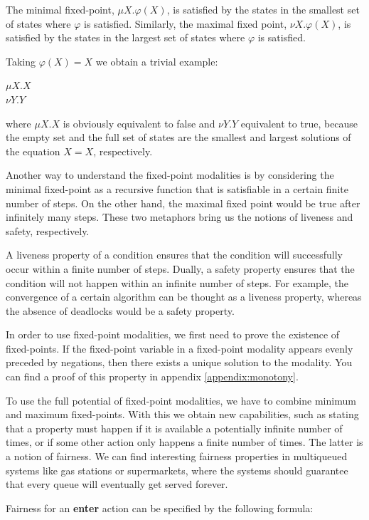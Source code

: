 \documentclass[11pt]{article}
\theoremstyle{definition}
\theoremstyle{plain}
\let\temp\phi
\let\phi\varphi
\let\varphi\temp
\begin{document}
The minimal fixed-point, $ \mu X.\phi(X) $, is satisfied by the states in the smallest set of states where $ \phi $ is satisfied. Similarly, the maximal fixed point, $ \nu X.\phi(X) $, is satisfied by the states in the largest set of states where $ \phi $ is satisfied.

Taking $ \phi(X)=X $ we obtain a trivial example:
\begin{center}
	$ \mu X. X $ \\
	$ \nu Y. Y $
\end{center}

where $ \mu X. X $ is obviously equivalent to false and $ \nu Y. Y $ equivalent to true, because the empty set and the full set of states are the smallest and largest solutions of the equation $ X = X $, respectively.

Another way to understand the fixed-point modalities is by considering the minimal fixed-point as a recursive function that is satisfiable in a certain finite number of steps. On the other hand, the maximal fixed point would be true after infinitely many steps. These two metaphors bring us the notions of liveness and safety, respectively.

A liveness property of a condition ensures that the condition will successfully occur within a finite number of steps. Dually, a safety property ensures that the condition will not happen within an infinite number of steps. For example, the convergence of a certain algorithm can be thought as a liveness property, whereas the absence of deadlocks would be a safety property.

In order to use fixed-point modalities, we first need to prove the existence of fixed-points. If the fixed-point variable in a fixed-point modality appears evenly preceded by negations, then there exists a unique solution to the modality. You can find a proof of this property in appendix \ref{appendix:monotony}.

To use the full potential of fixed-point modalities, we have to combine minimum and maximum fixed-points. With this we obtain new capabilities, such as stating that a property must happen if it is available a potentially infinite number of times, or if some other action only happens a finite number of times. The latter is a notion of fairness. We can find interesting fairness properties in multiqueued systems like gas stations or supermarkets, where the systems should guarantee that every queue will eventually get served forever.

Fairness for an \textbf{enter} action can be specified by the following formula:
\end{document}
